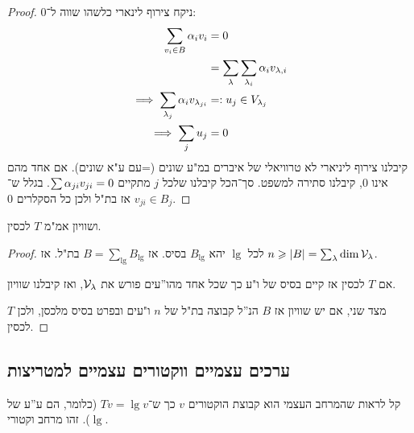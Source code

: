 \documentclass[name=רשימות אלגברה לינארית 2א]{../../../tex/classes/megasumPreamble}
\begin{document}
	
	
	
	\begin{proof}ניקח צירוף לינארי כלשהו שווה ל־0: 
		\begin{align*}
			\sum_{v_i \in B} \alpha_iv_i &= 0 \\
			&= \sum_{\lambda}\sum_{\lambda_i}\alpha_iv_{\lambda, i} \\
			\implies \sum_{\lambda_j}\alpha_i v_{\lambda_{ji}} &=: u_j \in V_{\lambda_j} \\
			\implies \sum_{j}u_j &= 0
		\end{align*}
		קיבלנו צירוף ליניארי לא טרוויאלי של איברים במ"ע שונים (=עם ע"א שונים). אם אחד מהם אינו 0, קיבלנו סתירה למשפט. סך־הכל קיבלנו שלכל $j$ מתקיים $\sum \alpha_{ji}v_{ji} = 0$. בגלל ש־$v_{ji} \in B_j$ אז בת"ל ולכן כל הסקלרים 0. 
	\end{proof}
	
	ושוויון אמ"מ $T$ לכסין. 
	
	\begin{proof}
		לכל $\lg$ יהא $B_\lg$ בסיס. אז $B = \sum_{\lg}B_\lg$ בת"ל. אז $n \geqslant |B| = \sum_\lambda \dim \mathcal{V}_{\lambda}$. 
		
		אם $T$ לכסין אז קיים בסיס של ו"ע כך שכל אחד מהו''עים פורש את $\mathcal{V}_{\lambda}$, ואז קיבלנו שוויון. 
		
		מצד שני, אם יש שוויון אז $B$ הנ''ל קבוצה בת"ל של $n$ ו"עים ובפרט בסיס מלכסן, ולכן $T$ לכסין. 
	\end{proof}
	
	\subsection{ערכים עצמיים ווקטורים עצמיים למטריצות}
	קל לראות שהמרחב העצמי הוא קבוצת הוקטורים $v$ כך ש־$Tv = \lg v$ (כלומר, הם ע''ע של $\lg$). זהו מרחב וקטורי. 
	
\end{document}
